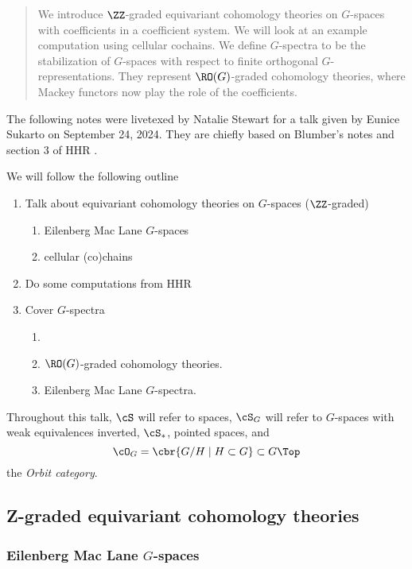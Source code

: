 \begin{abstract}
  We introduce $\ZZ$-graded equivariant cohomology theories on $G$-spaces with coefficients in a coefficient system. 
  We will look at an example computation using cellular cochains. 
  We define $G$-spectra to be the stabilization of $G$-spaces with respect to finite orthogonal $G$-representations. They represent $\RO(G)$-graded cohomology theories, where Mackey functors now play the role of the coefficients. 
\end{abstract}

The following notes were livetexed by Natalie Stewart for a talk given by Eunice Sukarto on September 24, 2024.
They are chiefly based on Blumber's notes \cite{burnside} and section 3 of HHR \cite{HHR}.

We will follow the following outline
\begin{enumerate}
  \item Talk about equivariant cohomology theories on $G$-spaces ($\ZZ$-graded)
    \begin{enumerate}
      \item Eilenberg Mac Lane $G$-spaces
      \item cellular (co)chains
    \end{enumerate}
  \item Do some computations from HHR
  \item Cover $G$-spectra
    \begin{enumerate}
      \item {}
      \item $\RO(G)$-graded cohomology theories.
      \item Eilenberg Mac Lane $G$-spectra.
    \end{enumerate}
\end{enumerate}

Throughout this talk, $\cS$ will refer to spaces, $\cS_G$ will refer to $G$-spaces with weak equivalences inverted, $\cS_*$, pointed spaces, and
\[
  \cO_G = \cbr{G/H \mid H \subset G} \subset G\Top
\]
the \emph{Orbit category}.

\subsection{Z-graded equivariant cohomology theories}%
\subsubsection{Eilenberg Mac Lane $G$-spaces}%

